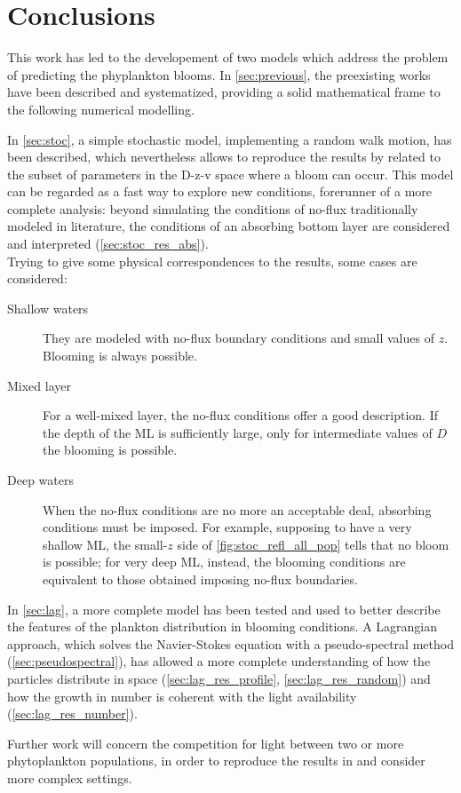 \section*{Conclusions}
This work has led to the developement of two models which address the problem of predicting the phyplankton blooms. In \autoref{sec:previous}, the preexisting works have been described and systematized, providing a solid mathematical frame to the following numerical modelling. 

In \autoref{sec:stoc}, a simple stochastic model, implementing a random walk motion, has been described, which nevertheless allows to reproduce the results by \autocite{Huisman2002HowPersist} related to the subset of parameters in the D-z-v space where a bloom can occur. This model can be regarded as a fast way to explore new conditions, forerunner of a more complete analysis: beyond simulating the conditions of no-flux traditionally modeled in literature, the conditions of an absorbing bottom layer are considered and interpreted (\autoref{sec:stoc_res_abs}). \\
Trying to give some physical correspondences to the results, some cases are considered:
\begin{description}
    \item[Shallow waters] They are modeled with no-flux boundary conditions and small values of $z$. Blooming is always possible.
    \item[Mixed layer] For a well-mixed layer, the no-flux conditions offer a good description. If the depth of the ML is sufficiently large, only for intermediate values of $D$ the blooming is possible.
    \item[Deep waters] When the no-flux conditions are no more an acceptable deal, absorbing conditions must be imposed. For example, supposing to have a very shallow ML, the small-$z$ side of \autoref{fig:stoc_refl_all_pop} tells that no bloom is possible; for very deep ML, instead, the blooming conditions are equivalent to those obtained imposing no-flux boundaries.
\end{description}

In \autoref{sec:lag}, a more complete model has been tested and used to better describe the features of the plankton distribution in blooming conditions. A Lagrangian approach, which solves the Navier-Stokes equation with a pseudo-spectral method (\autoref{sec:pseudospectral}), has allowed a more complete understanding of how the particles distribute in space (\autoref{sec:lag_res_profile}, \autoref{sec:lag_res_random}) and how the growth in number is coherent with the light availability (\autoref{sec:lag_res_number}). 

Further work will concern the competition for light between two or more phytoplankton populations, in order to reproduce the results in \autocite{Huisman2004ChangesSpecies} and consider more complex settings.